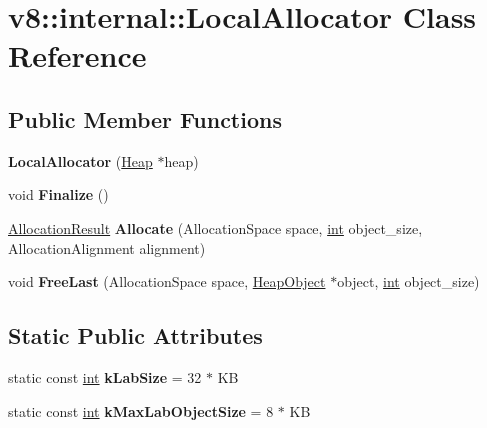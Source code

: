 \hypertarget{classv8_1_1internal_1_1LocalAllocator}{}\section{v8\+:\+:internal\+:\+:Local\+Allocator Class Reference}
\label{classv8_1_1internal_1_1LocalAllocator}
\subsection*{Public Member Functions}
\begin{DoxyCompactItemize}
\item 
\mbox{\label{classv8_1_1internal_1_1LocalAllocator_ac4b037faf26f3a6766c9ecec9a800eb3}} 
{\bfseries Local\+Allocator} (\mbox{\hyperlink{classv8_1_1internal_1_1Heap}{Heap}} $\ast$heap)
\item 
\mbox{\label{classv8_1_1internal_1_1LocalAllocator_a2bb8cfc4fb5f8b3c4a0a998ffa41172e}} 
void {\bfseries Finalize} ()
\item 
\mbox{\label{classv8_1_1internal_1_1LocalAllocator_a08a8bb708310a4c85cf282b3a0d3707a}} 
\mbox{\hyperlink{classv8_1_1internal_1_1AllocationResult}{Allocation\+Result}} {\bfseries Allocate} (Allocation\+Space space, \mbox{\hyperlink{classint}{int}} object\+\_\+size, Allocation\+Alignment alignment)
\item 
\mbox{\label{classv8_1_1internal_1_1LocalAllocator_a63defcdc91f141e9569a511e0e3b0d00}} 
void {\bfseries Free\+Last} (Allocation\+Space space, \mbox{\hyperlink{classv8_1_1internal_1_1HeapObject}{Heap\+Object}} $\ast$object, \mbox{\hyperlink{classint}{int}} object\+\_\+size)
\end{DoxyCompactItemize}
\subsection*{Static Public Attributes}
\begin{DoxyCompactItemize}
\item 
\mbox{\label{classv8_1_1internal_1_1LocalAllocator_af8ae02713fe6db3419e9fa8f4d9ae698}} 
static const \mbox{\hyperlink{classint}{int}} {\bfseries k\+Lab\+Size} = 32 $\ast$ KB
\item 
\mbox{\label{classv8_1_1internal_1_1LocalAllocator_a8e67d3a8adc2ac69f21bb00559aa20cc}} 
static const \mbox{\hyperlink{classint}{int}} {\bfseries k\+Max\+Lab\+Object\+Size} = 8 $\ast$ KB
\end{DoxyCompactItemize}


